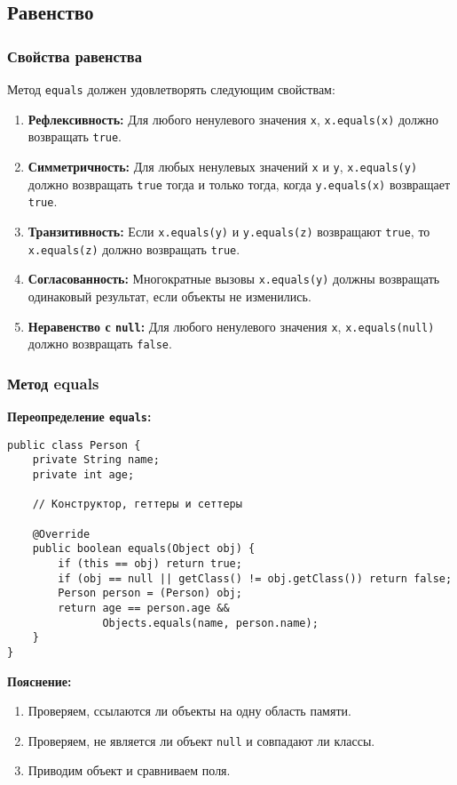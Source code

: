 \subsection{Равенство}

\subsubsection{Свойства равенства}

Метод \texttt{equals} должен удовлетворять следующим свойствам:
\begin{enumerate}
    \item \textbf{Рефлексивность:} Для любого ненулевого значения \texttt{x}, \texttt{x.equals(x)} должно возвращать \texttt{true}.
    \item \textbf{Симметричность:} Для любых ненулевых значений \texttt{x} и \texttt{y}, \texttt{x.equals(y)} должно возвращать \texttt{true} тогда и только тогда, когда \texttt{y.equals(x)} возвращает \texttt{true}.
    \item \textbf{Транзитивность:} Если \texttt{x.equals(y)} и \texttt{y.equals(z)} возвращают \texttt{true}, то \texttt{x.equals(z)} должно возвращать \texttt{true}.
    \item \textbf{Согласованность:} Многократные вызовы \texttt{x.equals(y)} должны возвращать одинаковый результат, если объекты не изменились.
    \item \textbf{Неравенство с \texttt{null}:} Для любого ненулевого значения \texttt{x}, \texttt{x.equals(null)} должно возвращать \texttt{false}.
\end{enumerate}

\subsubsection{Метод equals}

\textbf{Переопределение \texttt{equals}:}
\begin{verbatim}
public class Person {
    private String name;
    private int age;

    // Конструктор, геттеры и сеттеры

    @Override
    public boolean equals(Object obj) {
        if (this == obj) return true;
        if (obj == null || getClass() != obj.getClass()) return false;
        Person person = (Person) obj;
        return age == person.age &&
               Objects.equals(name, person.name);
    }
}
\end{verbatim}

\textbf{Пояснение:}
\begin{enumerate}
    \item Проверяем, ссылаются ли объекты на одну область памяти.
    \item Проверяем, не является ли объект \texttt{null} и совпадают ли классы.
    \item Приводим объект и сравниваем поля.
\end{enumerate}

